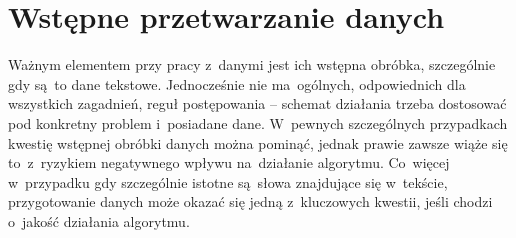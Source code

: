 \documentclass{praca1}
\begin{document}
\section{Wstępne przetwarzanie danych}

Ważnym elementem przy pracy z~danymi jest ich wstępna obróbka, szczególnie gdy są~to dane tekstowe. Jednocześnie nie ma~ogólnych, odpowiednich dla wszystkich zagadnień, reguł postępowania -- schemat działania trzeba dostosować pod konkretny problem i~posiadane dane. W~pewnych szczególnych przypadkach kwestię wstępnej obróbki danych można pominąć, jednak prawie zawsze wiąże się to~z~ryzykiem negatywnego wpływu na~działanie algorytmu. Co~więcej w~przypadku gdy szczególnie istotne są~słowa znajdujące się w~tekście, przygotowanie danych może okazać się jedną z~kluczowych kwestii, jeśli chodzi o~jakość działania algorytmu.
\end{document}
